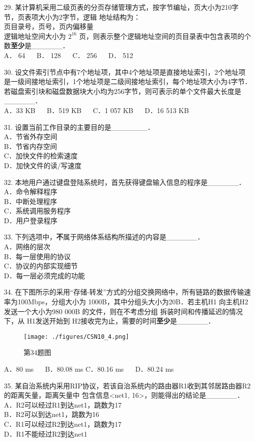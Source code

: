 29. 某计算机采用二级页表的分页存储管理方式，按字节编址，页大小为210字节，页表项大小为2字节，逻辑
地址结构为：  \\
页目录号，页号，页内偏移量 \\
逻辑地址空间大小为 $2^{16}$ 页，则表示整个逻辑地址空间的页目录表中包含表项的个数\textbf{至少}是______． \\
A． 64 $\quad$ B． 128 $\quad$ C． 256 $\quad$ D． 512

30. 设文件索引节点中有7个地址项，其中4个地址项是直接地址索引，2个地址项是一级间接地址索引，1个地址项是二级间接地址索引，每个地址项大小为4字节．若磁盘索引块和磁盘数据块大小均为256字节，则可表示的单个文件最大长度是______． \\
A．33 KB $\quad$ B．519 KB $\quad$ C．1 057 KB $\quad$ D．16 513 KB

31. 设置当前工作目录的主要目的是_______． \\
A．节省外存空间 \\
B．节省内存空间 \\
C．加快文件的检索速度 \\
D．加快文件的读/写速度

32. 本地用户通过键盘登陆系统时，首先获得键盘输入信息的程序是______．  \\
A．命令解释程序 \\
B．中断处理程序 \\
C．系统调用服务程序 \\
D．用户登录程序

33. 下列选项中，\textbf{不}属于网络体系结构所描述的内容是______．  \\
A．网络的层次  \\
B．每一层使用的协议  \\
C．协议的内部实现细节  \\
D．每一层必须完成的功能

34. 在下图所示的采用“存储-转发”方式的分组交换网络中，所有链路的数据传输速率为100Mbps，分组大小为
1000B，其中分组头大小为20B．若主机H1 向主机H2 发送一个大小为980 000B 的文件，则在不考虑分组
拆装时间和传播延迟的情况下，从 H1发送开始到 H2接收完为止，需要的时间\textbf{至少}是______．  \\
\begin{figure}[ht]
\centering
\texttt{[image: ./figures/CSN10\_4.png]}
\caption{第34题图} \label{CSN10_fig4}
\end{figure}
A．80 ms $\quad$ B．80.08 ms
C．80.16 ms $\quad$ D．80.24 ms

35. 某自治系统内采用RIP协议，若该自治系统内的路由器R1收到其邻居路由器R2的距离矢量，距离矢量中
包含信息<net1, 16>，则能得出的结论是______．  \\
A．R2可以经过R1到达net1，跳数为17  \\
B．R2可以到达net1，跳数为16  \\
C．R1可以经过R2到达net1，跳数为17  \\
D．R1不能经过R2到达net1  \\

